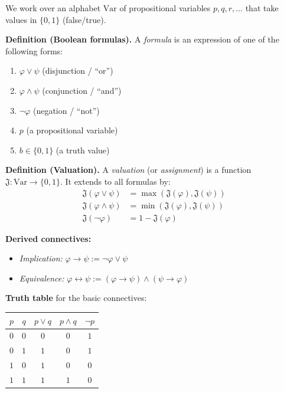 \documentclass[11pt, a4paper]{article}
\theoremstyle{definition}
\theoremstyle{remark}
\begin{document}
We work over an alphabet $\mathrm{Var}$ of propositional variables $p,q,r,\ldots$ that take
values in $\{0,1\}$ (false/true).

\begin{defbox}
\textbf{Definition (Boolean formulas).}
A \emph{formula} is an expression of one of the following forms:
\begin{enumerate}[itemsep=2pt]
  \item $\varphi\lor\psi$ \quad (disjunction / ``or'')
  \item $\varphi\land\psi$ \quad (conjunction / ``and'')
  \item $\lnot\varphi$ \quad (negation / ``not'')
  \item $p$ \quad (a propositional variable)
  \item $b\in\{0,1\}$ \quad (a truth value)
\end{enumerate}
\end{defbox}

\begin{defbox}
\textbf{Definition (Valuation).}
A \emph{valuation} (or \emph{assignment}) is a function $\mathfrak{J}\colon\mathrm{Var}\to\{0,1\}$.
It extends to all formulas by:
\begin{align*}
  \mathfrak{J}(\varphi\lor\psi)  &= \max(\mathfrak{J}(\varphi),\mathfrak{J}(\psi)) \\
  \mathfrak{J}(\varphi\land\psi) &= \min(\mathfrak{J}(\varphi),\mathfrak{J}(\psi)) \\
  \mathfrak{J}(\lnot\varphi)     &= 1-\mathfrak{J}(\varphi)
\end{align*}
\end{defbox}

\textbf{Derived connectives:}
\begin{itemize}
  \item \emph{Implication:} $\varphi\to\psi := \lnot\varphi\lor\psi$
  \item \emph{Equivalence:} $\varphi\leftrightarrow\psi := (\varphi\to\psi)\land(\psi\to\varphi)$
\end{itemize}

\textbf{Truth table} for the basic connectives:

\begin{center}
\begin{tabular}{cc|ccc}
  \toprule
  $p$ & $q$ & $p\lor q$ & $p\land q$ & $\lnot p$ \\
  \midrule
  $0$ & $0$ & $0$ & $0$ & $1$ \\
  $0$ & $1$ & $1$ & $0$ & $1$ \\
  $1$ & $0$ & $1$ & $0$ & $0$ \\
  $1$ & $1$ & $1$ & $1$ & $0$ \\
  \bottomrule
\end{tabular}
\end{center}
\end{document}
